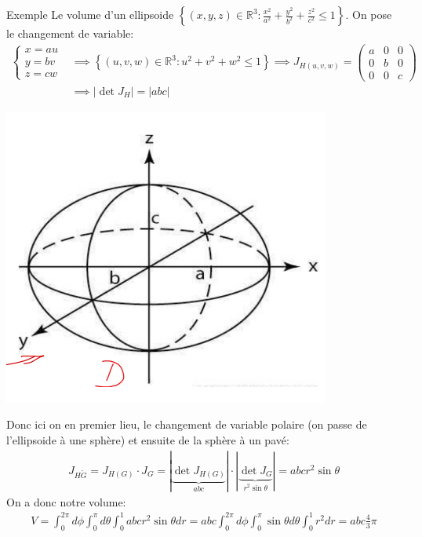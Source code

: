 \begin{parag}{Exemple}
    Le volume d'un ellipsoide $\left\{\left(x, y, z\right) \in \mathbb{R}^{3}: \frac{x^2}{a^2} + \frac{y^2}{b^2} + \frac{z^2}{c^2} \leq 1\right\}$.
    On pose le changement de variable:
    \begin{align*} 
        \begin{cases}
            x =  au\\
            y = bv\\
            z = cw
            \end{cases} &\implies \left\{\left(u, v, w\right)\in \mathbb{R}^{3}: u^2 + v^2 + w^2 \leq 1\right\} \implies J_{H\left(u, v, w\right)} = \begin{pmatrix} a & 0 & 0 \\ 0 & b & 0 \\ 0 & 0 & c \end{pmatrix} \\
                        &\implies \left|\det J_H\right| = \left|abc\right| 
    \end{align*}
    \begin{center}
        \includegraphics[scale=0.7]{62025-05-26.png}
    \end{center}
    
    Donc ici on en premier lieu, le changement de variable polaire (on passe de l'ellipsoide à une sphère) et ensuite de la sphère à un pavé:
    \begin{align*} 
        J_{H \mathring G} = J_{H\left(G\right)} \cdot  J_G = \left| \underbrace{\det J_{H\left(G\right)}}_{abc}\right| \cdot  \left|\underbrace{\det J_G}_{r^2 \sin \theta}\right| = abcr^2\sin\theta
    \end{align*}
    On a donc notre volume:
    \begin{align*}
        V =  \int_0^{2\pi}d\phi \int_0^\pi d \theta \int_0^1 abcr^2\sin\theta dr =  abc\int_0^{2\pi} d \phi \int_0^\pi \sin \theta d \theta \int_0^1 r^2 dr =  abc \frac{4}{3}\pi
    \end{align*}
\end{parag}

